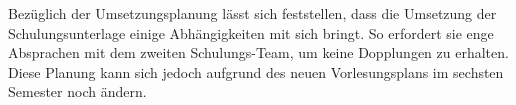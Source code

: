 Bezüglich der Umsetzungsplanung lässt sich feststellen, dass die Umsetzung der Schulungsunterlage
einige Abhängigkeiten mit sich bringt. So erfordert sie enge Absprachen mit dem zweiten
Schulungs-Team, um keine Dopplungen zu erhalten. Diese Planung kann sich jedoch aufgrund
des neuen Vorlesungsplans im sechsten Semester noch ändern. 

